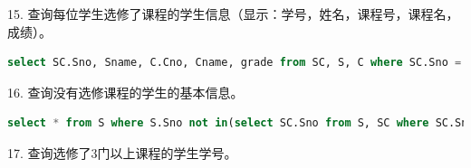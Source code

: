 \documentclass[12pt, a4paper]{report}
\begin{document}
15. 查询每位学生选修了课程的学生信息（显示：学号，姓名，课程号，课程名，成绩）。\\

\begin{lstlisting}[language=SQL]
    select SC.Sno, Sname, C.Cno, Cname, grade from SC, S, C where SC.Sno = S.Sno and SC.cno = C.cno;
\end{lstlisting}

\begin{figure}[H] %
    \centering %
\end{figure}

16. 查询没有选修课程的学生的基本信息。\\

\begin{lstlisting}[language=SQL]
    select * from S where S.Sno not in(select SC.Sno from S, SC where SC.Sno = S.Sno);
\end{lstlisting}

\begin{figure}[H] %
    \centering %
\end{figure}

17. 查询选修了3门以上课程的学生学号。\\
\end{document}
